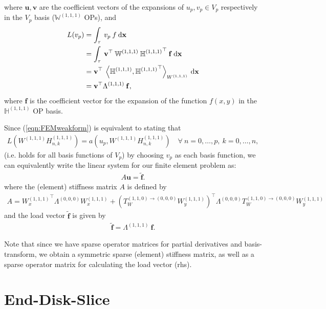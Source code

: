 \documentclass[11pt, oneside]{article}   	%
\newcommand{\bstodo}{\todo[color=pink]}
\newcommand{\hdop}{H}
\newcommand{\element}{\tau}
\newcommand{\Wiii}{W^{(1,1,1)}}
\newcommand{\hdopiii}{\hdop^{(1,1,1)}}
\newcommand{\bighdopiii}{{\mathbb{\hdop}^{(1,1,1)}}}
\newcommand{\bigWiii}{{\mathbb{W}^{(1,1,1)}}}
\begin{document}
where $\mathbf{u}, \mathbf{v}$ are the coefficient vectors of the expansions of $u_p, v_p \in V_p$ respectively in the $V_p$ basis ($\bigWiii$ OPs), and
\begin{align*}
	L(v_p) &= \int_\element \: v_p \: f \: \D \mathbf{x}\\
	&= \int_\element \: \mathbf{v}^\top \: \bigWiii \: \bighdopiii^\top \: \mathbf{f} \: \D \mathbf{x} \\
	&= \mathbf{v}^\top \: \ip< \bighdopiii, {\bighdopiii}^\top >_{\Wiii} \: \D \mathbf{x} \\
	&= \mathbf{v}^\top \Lambda^{(1,1,1)} \: \mathbf{f},
\end{align*}
where $\mathbf{f}$ is the coefficient vector for the expansion of the function $f(x,y)$ in the $\bighdopiii$ OP basis.

Since (\ref{eqn:FEMweakform}) is equivalent to stating that
\begin{align*}
	L(\Wiii \hdopiii_{n,k}) = a(u_p,\Wiii \hdopiii_{n,k}) \quad \forall \: n = 0,\dots,p, \: k = 0,\dots,n,
\end{align*}
(i.e. holds for all basis functions of $V_p$) by choosing $v_p$ as each basis function, we can equivalently write the linear system for our finite element problem as:
\begin{align*}
	A\mathbf{u} = \tilde{\mathbf{f}}.
\end{align*}
where the (element) stiffness matrix $A$ is defined by 
\begin{align*}
	A = {\Wiii_x}^\top \Lambda^{(0,0,0)} \Wiii_x + ({T_W^{(1,1,0)\to(0,0,0)} \Wiii_y})^\top \Lambda^{(0,0,0)} T_W^{(1,1,0)\to(0,0,0)} \Wiii_y
\end{align*}
and the load vector $\tilde{\mathbf{f}}$ is given by 
\begin{align*}
	\tilde{\mathbf{f}} = \Lambda^{(1,1,1)} \: \mathbf{f}.
\end{align*}

Note \bstodo{typo 6}that since we have sparse operator matrices for partial derivatives and basis-transform, we obtain a symmetric sparse (element) stiffness matrix, as well as a sparse operator matrix for calculating the load vector (rhs).


\section{End-Disk-Slice}\label{Appendix:HalfDisk}
\end{document}
